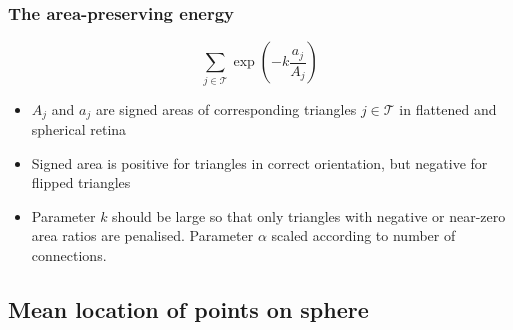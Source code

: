 \documentclass{article}
\newcommand{\EE}{\ensuremath{E_\mathrm{E}}\xspace}
\begin{document}



\subsubsection{The area-preserving energy}
\label{fold-sphere:sec:area-pres-energy}

\begin{displaymath}
  \sum_{j\in\mathcal{T}} \exp\left(-k\frac{a_j}{A_j}\right)
\end{displaymath}
\begin{itemize}
\item $A_j$ and $a_j$ are signed areas of corresponding triangles
  $j\in\mathcal{T}$ in flattened and spherical retina
\item Signed area is positive for triangles in correct orientation,
  but negative for flipped triangles
\item Parameter $k$ should be large so that only triangles with
  negative or near-zero area ratios are penalised. Parameter $\alpha$
  scaled according to number of connections.
\end{itemize}

\subsection{Mean location of points on sphere}
\label{fold-sphere:sec:mean-location-points}
\end{document}
